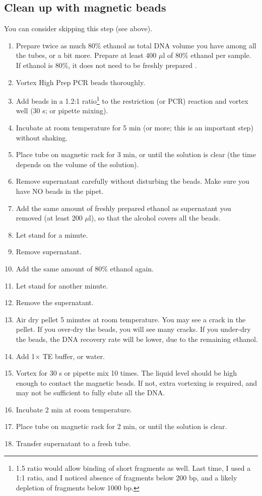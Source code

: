 \documentclass[a4paper,12pt]{article}
\begin{document}
\subsection{Clean up with magnetic beads}
You can consider skipping this step (see above).
\begin{enumerate}
\item Prepare twice as much 80\% ethanol as total DNA volume you have among all the tubes, or a bit more. Prepare at least 400 $\mu$l of 80\% ethanol per sample. If ethanol is 80\%, it does not need to be freshly prepared \cite{Bronner2009}.
\item Vortex High Prep PCR beads thoroughly.
\item Add beads in a 1.2:1 ratio\footnote{1.5 ratio would allow binding of short fragments as well. Last time, I used a 1:1 ratio, and I noticed absence of fragments below 200 bp, and a likely depletion of fragments below 1000 bp.} to the restriction (or PCR) reaction and vortex well (30 s; or pipette mixing).
\item Incubate at room temperature for 5 min (or more; this is an important step) without shaking.
\item Place tube on magnetic rack for 3 min, or until the solution is clear (the time depends on the volume of the solution).
\item Remove supernatant carefully without disturbing the beads. Make sure you have NO beads in the pipet.
\item Add the same amount of freshly prepared ethanol as supernatant you removed (at least 200 $\mu$l), so that the alcohol covers all the beads.
\item Let stand for a minute.
\item Remove supernatant.
\item Add the same amount of 80\% ethanol again.
\item Let stand for another minute.
\item Remove the supernatant.
\item Air dry pellet 5 minutes at room temperature. You may see a crack in the pellet. If you over-dry the beads, you will see many cracks. If you under-dry the beads, the DNA recovery rate will be lower, due to the remaining ethanol. 
\item Add 1$\times$ TE buffer, or water.
\item Vortex for 30 s or pipette mix 10 times. The liquid level should be high enough to contact the magnetic beads. If not, extra vortexing is required, and may not be sufficient to fully elute all the DNA.
\item Incubate 2 min at room temperature.
\item Place tube on magnetic rack for 2 min, or until the solution is clear.
\item Transfer supernatant to a fresh tube.
\end{enumerate}
\end{document}
